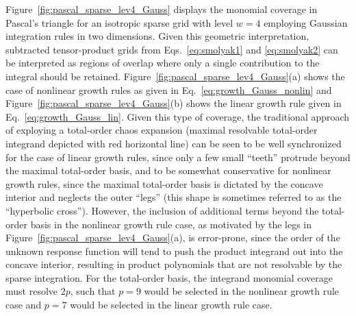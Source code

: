 Figure~\ref{fig:pascal_sparse_lev4_Gauss} displays the monomial
coverage in Pascal's triangle for an isotropic sparse grid with level
$w = 4$ employing Gaussian integration rules in two dimensions.  Given
this geometric interpretation, subtracted tensor-product grids from
Eqs.~\ref{eq:smolyak1} and \ref{eq:smolyak2} can be interpreted as
regions of overlap where only a single contribution to the integral
should be retained.  Figure~\ref{fig:pascal_sparse_lev4_Gauss}(a)
shows the case of nonlinear growth rules as given in
Eq.~\ref{eq:growth_Gauss_nonlin} and
Figure~\ref{fig:pascal_sparse_lev4_Gauss}(b) shows the linear growth
rule given in Eq.~\ref{eq:growth_Gauss_lin}.  Given this type of
coverage, the traditional approach of exploying a total-order chaos
expansion (maximal resolvable total-order integrand depicted with red
horizontal line) can be seen to be well synchronized for the case of
linear growth rules, since only a few small ``teeth'' protrude beyond
the maximal total-order basis, and to be somewhat conservative for
nonlinear growth rules, since the maximal total-order basis is
dictated by the concave interior and neglects the outer ``legs'' 
(this shape is sometimes referred to as the ``hyperbolic cross'').
However, the inclusion of additional terms beyond the total-order
basis in the nonlinear growth rule case, as motivated by the legs in
Figure~\ref{fig:pascal_sparse_lev4_Gauss}(a), is error-prone, since
the order of the unknown response function will tend to push the
product integrand out into the concave interior, resulting in product
polynomials that are not resolvable by the sparse integration.
For the total-order basis, the integrand monomial coverage must
resolve $2p$, such that $p = 9$ would be selected in the nonlinear
growth rule case and $p = 7$ would be selected in the linear growth
rule case.
